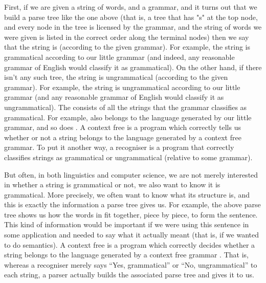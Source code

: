 First, if we are given a string of words, and a grammar, and it turns
out that we  build a parse tree like the one above (that is, a
tree that has "s" at the top node, and every node in the tree is
licensed by the grammar, and the string of words we were given is
listed in the correct order along the terminal nodes) then we say that
the string is  (according to the given grammar).  For
example, the string  is grammatical according
to our little grammar (and indeed, any reasonable grammar of English
would classify it as grammatical). On the other hand, if there isn't
any such tree, the string is ungrammatical (according to the
given grammar). For example, the string  is ungrammatical according to our little grammar (and any
reasonable grammar of English would classify it as ungrammatical).
The  consists of all the strings
that the grammar classifies as grammatical.  For example,  also belongs to the language generated by our little
grammar, and so does . A context free
 is a program which correctly tells us whether or not a
string belongs to the language generated by a context free grammar.
To put it another way, a recogniser is a program that correctly classifies strings
as grammatical or ungrammatical (relative to some grammar).

But often, in both linguistics and computer science, we are not merely
interested in whether a string is grammatical or not, we also want to
know  it is grammatical.  More precisely, we often want
to know what its structure is, and this is exactly the information a
parse tree gives us. For example, the above parse tree shows us how
the words in  fit together, piece by
piece, to form the sentence.  This kind of information would be
important if we were using this sentence in some application and
needed to say what it actually meant (that is, if we wanted to do
semantics). A context free  is a program which
correctly decides whether a string belongs to the language generated
by a context free grammar .  That is, whereas a recogniser merely says ``Yes,
grammatical'' or ``No, ungrammatical'' to each string, a parser actually
builds the associated parse tree and gives it to us.

